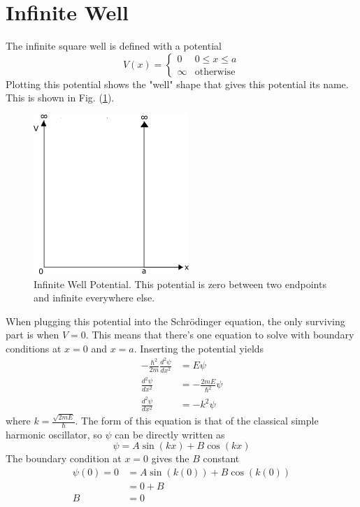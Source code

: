 \section{Infinite Well}
The infinite square well is defined with a potential 
\begin{equation}
    V(x)=\begin{cases} 0 & 0\leq x \leq a\\
                       \infty & \text{otherwise}
        \end{cases}
\end{equation}
Plotting this potential shows the "well" shape that gives this potential its name. This is shown in Fig. (\ref{fig: Infinite Well Potential}).
\begin{figure}[H]
    \centering
    \includegraphics[scale=0.75]{figures/pdf/sqwellpot.png}
    \caption{Infinite Well Potential. This potential is zero between two endpoints and infinite everywhere else.}
    \label{fig: Infinite Well Potential}
\end{figure}
When plugging this potential into the Schr\"odinger equation, the only surviving part is when $V=0$. This means that there's one equation to solve with boundary conditions at $x=0$ and $x=a$. Inserting the potential yields
\begin{align}
    -\frac{\hbar^2}{2m}\frac{d^2\psi}{dx^2}&=E\psi\nonumber\\
    \frac{d^2\psi}{dx^2}&=-\frac{2mE}{\hbar^2}\psi\nonumber\\
    \frac{d^2\psi}{dx^2}&=-k^2\psi
\end{align}
where $k=\frac{\sqrt{2mE}}{\hbar}$. The form of this equation is that of the classical simple harmonic oscillator, so $\psi$ can be directly written as 
\begin{equation}
    \psi=A\sin(kx)+B\cos(kx)
\end{equation}
The boundary condition at $x=0$ gives the $B$ constant 
\begin{align}
    \psi(0)=0&=A\sin(k(0))+B\cos(k(0))\\
    &=0+B\\
    B&=0
\end{align}
